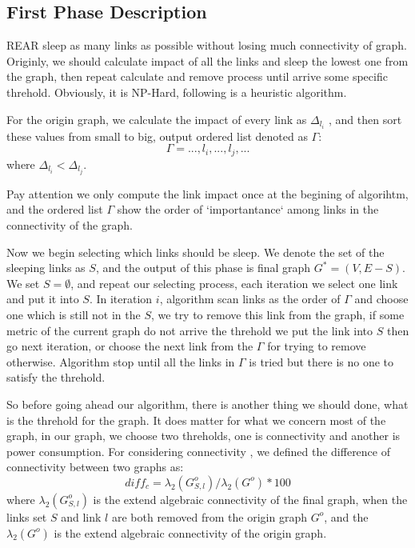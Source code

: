 \documentclass[conference]{IEEEtran}
\begin{document}
\subsection{First Phase Description}
REAR sleep as many links as possible without losing much connectivity of graph. Originly,  we should
calculate impact of all the links and sleep the lowest one from the graph, then repeat calculate and remove
process until arrive some specific threhold. Obviously, it is NP-Hard, following is a heuristic algorithm.


For the origin graph, we calculate the impact of every link as $\Delta_{l_i}$ , and then sort these values
from small to big, output ordered list denoted as $\Gamma$: 
\begin{equation}
	\Gamma = {..., l_i, ..., l_j, ...}
\end{equation}
where $\Delta_{l_i} < \Delta_{l_j}$.


Pay attention we only compute the link impact once at the begining of algorihtm, and the ordered list $\Gamma$ show 
the order of `importantance` among links in the connectivity of the graph. 


Now we begin selecting which links should be sleep.
We denote the set of the sleeping links as $S$, and the output of this phase is final graph $G^* = (V, E-S)$. We set 
$S = \emptyset$, and repeat our selecting process, each iteration we select one link and put it into $S$. 
In iteration $i$, algorithm scan links as the order of $\Gamma$ and choose one which is still not in the $S$, we try to
remove this link from the graph, if some metric of the current graph do not arrive the threhold we put the link into
$S$ then go next iteration, or choose the next link from the $\Gamma$ for trying to remove otherwise. Algorithm
stop until all the links in $\Gamma$ is tried but there is no one to satisfy the threhold.


So before going ahead our algorithm, there is another thing we should done, what is the threhold for the graph.
It does matter for what we concern most of the graph, in our graph, we choose two threholds, one is connectivity and
another is power consumption. For considering connectivity , we defined the difference of connectivity between 
two graphs as:
\begin{equation}
	diff_c = \lambda_2(G_{S, l}^o) / \lambda_2(G^o) * 100
\end{equation}
where $\lambda_2(G_{S, l}^o)$ is the extend algebraic connectivity of the final graph, when the links set $S$ and 
link $l$ are both removed from the origin graph $G^o$, and the $\lambda_2(G^o)$ is the extend algebraic connectivity of 
the origin graph.
\end{document}
